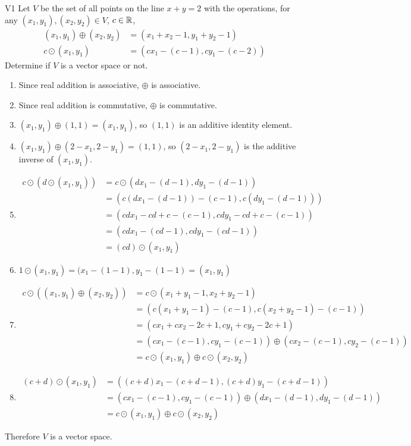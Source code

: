 \documentclass{sbgLAquiz}
\begin{document}
\begin{problem}{V1}
Let $V$ be the set of all points on the line $x+y=2$ with the operations, for any $(x_1,y_1), (x_2,y_2) \in V$, $c \in \mathbb{R}$,
\begin{align*}
(x_1,y_1) \oplus (x_2,y_2) &= (x_1+x_2-1,y_1+y_2-1) \\
c \odot (x_1,y_1) &= (cx_1-(c-1), cy_1-(c-2))
\end{align*}
Determine if $V$ is a vector space or not.
\end{problem}
\begin{solution}
\begin{enumerate}[1)]
\item Since real addition is associative, $\oplus$ is associative.
\item Since real addition is commutative, $\oplus$ is commutative.
\item $(x_1,y_1) \oplus (1,1) = (x_1,y_1)$, so $(1,1)$ is an additive identity element.
\item $(x_1,y_1) \oplus (2-x_1,2-y_1) = (1,1)$, so $(2-x_1,2-y_1)$ is the additive inverse of $(x_1,y_1)$.
\item \begin{align*} c\odot \left(d \odot (x_1,y_1) \right) &=c\odot \left( dx_1-(d-1),dy_1-(d-1)\right) \\ 
&= \left( c\left(dx_1-(d-1) \right)-(c-1), c\left(dy_1-(d-1) \right) \right) \\
&= \left(cdx_1-cd+c-(c-1), cdy_1-cd+c-(c-1) \right) \\
&= \left(cdx_1-(cd-1), cdy_1-(cd-1) \right) \\
&= (cd) \odot (x_1,y_1)
\end{align*}
\item $1 \odot (x_1,y_1) = (x_1-(1-1),y_1-(1-1)=(x_1,y_1)$
\item \begin{align*} c \odot \left( (x_1,y_1)\oplus(x_2,y_2) \right) &= 
c\odot \left( x_1+y_1-1,x_2+y_2-1 \right) \\
&= \left( c(x_1+y_1-1)-(c-1), c(x_2+y_2-1)-(c-1) \right) \\
&= (cx_1+cx_2-2c+1, cy_1+cy_2-2c+1) \\
&= \left(cx_1-(c-1),cy_1-(c-1) \right) \oplus (cx_2-(c-1),cy_2-(c-1)) \\
&=c \odot (x_1,y_1) \oplus c\odot (x_2,y_2) 
\end{align*}
\item \begin{align*} (c+d) \odot (x_1,y_1) &=
\left( (c+d)x_1-(c+d-1), (c+d)y_1-(c+d-1) \right) \\
&= \left( cx_1-(c-1), cy_1-(c-1) \right) \oplus (dx_1-(d-1), dy_1-(d-1) ) \\
&= c\odot (x_1,y_1) \oplus c \odot (x_2,y_2)
\end{align*}
\end{enumerate}
Therefore $V$ is a vector space.
\end{solution}
\end{document}
